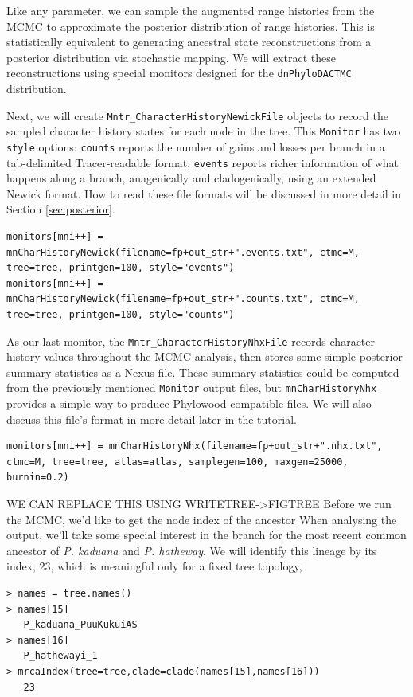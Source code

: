 Like any parameter, we can sample the augmented range histories from the MCMC to approximate the posterior distribution of range histories.
This is statistically equivalent to generating ancestral state reconstructions from a posterior distribution via stochastic mapping.
We will extract these reconstructions using special monitors designed for the {\tt dnPhyloDACTMC} distribution.

Next, we will create {\tt Mntr\_CharacterHistoryNewickFile} objects to record the sampled character history states for each node in the tree.
This {\tt Monitor} has two {\tt style} options: {\tt counts} reports the number of gains and losses per branch in a tab-delimited Tracer-readable format;  {\tt events} reports richer information of what happens along a branch, anagenically and cladogenically, using an extended Newick format.
How to read these file formats will be discussed in more detail in Section \ref{sec:posterior}.

\begin{snugshade}
\begin{lstlisting}
monitors[mni++] = mnCharHistoryNewick(filename=fp+out_str+".events.txt", ctmc=M, tree=tree, printgen=100, style="events")
monitors[mni++] = mnCharHistoryNewick(filename=fp+out_str+".counts.txt", ctmc=M, tree=tree, printgen=100, style="counts")
\end{lstlisting}
\end{snugshade}

As our last monitor, the {\tt Mntr\_CharacterHistoryNhxFile} records character history values throughout the MCMC analysis, then stores some simple posterior summary statistics as a Nexus file.
These summary statistics could be computed from the previously mentioned {\tt Monitor} output files, but {\tt mnCharHistoryNhx} provides a simple way to produce Phylowood-compatible files.
We will also discuss this file's format in more detail later in the tutorial.

\begin{snugshade}
\begin{lstlisting}
monitors[mni++] = mnCharHistoryNhx(filename=fp+out_str+".nhx.txt", ctmc=M, tree=tree, atlas=atlas, samplegen=100, maxgen=25000, burnin=0.2)
\end{lstlisting}
\end{snugshade}

WE CAN REPLACE THIS USING WRITETREE->FIGTREE
Before we run the MCMC, we'd like to get the node index of the ancestor 
When analysing the output, we'll take some special interest in the branch for the most recent common ancestor of {\it P. kaduana} and {\it P. hatheway}.
We will identify this lineage by its index, 23, which is meaningful only for a fixed tree topology,
\begin{snugshade}
\begin{lstlisting}
> names = tree.names()
> names[15]
   P_kaduana_PuuKukuiAS
> names[16]
   P_hathewayi_1
> mrcaIndex(tree=tree,clade=clade(names[15],names[16]))
   23
\end{lstlisting}
\end{snugshade}


